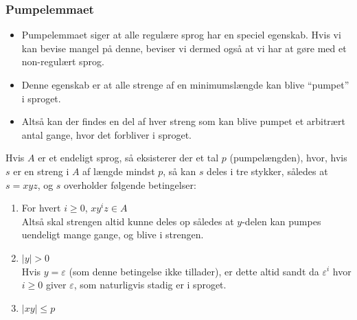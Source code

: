 \begin{frame}[allowframebreaks]
	\frametitle{Pumpelemmaet}
	\begin{itemize}
		\item Pumpelemmaet siger at alle regulære sprog har en speciel egenskab. Hvis vi kan bevise mangel på denne, beviser vi dermed også at vi har at gøre med et non-regulært sprog.
		\item Denne egenskab er at alle strenge af en minimumslængde kan blive ``pumpet'' i sproget.
		\item Altså kan der findes en del af hver streng som kan blive pumpet et arbitrært antal gange, hvor det forbliver i sproget.
	\end{itemize}

	\begin{theorem}[Pumpelemmaet]
		Hvis $A$ er et endeligt sprog, så eksisterer der et tal $p$ (pumpelængden), hvor, hvis $s$ er en streng i $A$ af længde mindst $p$, så kan $s$ deles i tre stykker, således at $s = xyz$, og $s$ overholder følgende betingelser:
		\begin{enumerate}
			\item For hvert $i \ge 0$, $xy^{i}z \in A$ \\ Altså skal strengen altid kunne deles op således at $y$-delen kan pumpes uendeligt mange gange, og blive i strengen.
			\item $|y| > 0$ \\ Hvis $y = \varepsilon$ (som denne betingelse ikke tillader), er dette altid sandt da $\varepsilon^{i}$ hvor $i \ge 0$  giver $\varepsilon$, som naturligvis stadig er i sproget.
			\item $|xy| \le p$
		\end{enumerate}
	\end{theorem}
\end{frame}


